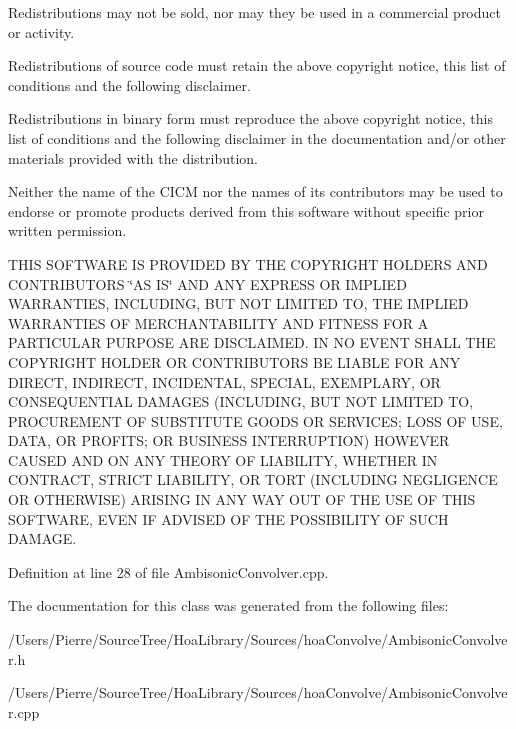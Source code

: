 \begin{DoxyItemize}
\item Redistributions may not be sold, nor may they be used in a commercial product or activity.
\item Redistributions of source code must retain the above copyright notice, this list of conditions and the following disclaimer.
\item Redistributions in binary form must reproduce the above copyright notice, this list of conditions and the following disclaimer in the documentation and/or other materials provided with the distribution.
\item Neither the name of the C\-I\-C\-M nor the names of its contributors may be used to endorse or promote products derived from this software without specific prior written permission.
\end{DoxyItemize}

T\-H\-I\-S S\-O\-F\-T\-W\-A\-R\-E I\-S P\-R\-O\-V\-I\-D\-E\-D B\-Y T\-H\-E C\-O\-P\-Y\-R\-I\-G\-H\-T H\-O\-L\-D\-E\-R\-S A\-N\-D C\-O\-N\-T\-R\-I\-B\-U\-T\-O\-R\-S \char`\"{}\-A\-S I\-S\char`\"{} A\-N\-D A\-N\-Y E\-X\-P\-R\-E\-S\-S O\-R I\-M\-P\-L\-I\-E\-D W\-A\-R\-R\-A\-N\-T\-I\-E\-S, I\-N\-C\-L\-U\-D\-I\-N\-G, B\-U\-T N\-O\-T L\-I\-M\-I\-T\-E\-D T\-O, T\-H\-E I\-M\-P\-L\-I\-E\-D W\-A\-R\-R\-A\-N\-T\-I\-E\-S O\-F M\-E\-R\-C\-H\-A\-N\-T\-A\-B\-I\-L\-I\-T\-Y A\-N\-D F\-I\-T\-N\-E\-S\-S F\-O\-R A P\-A\-R\-T\-I\-C\-U\-L\-A\-R P\-U\-R\-P\-O\-S\-E A\-R\-E D\-I\-S\-C\-L\-A\-I\-M\-E\-D. I\-N N\-O E\-V\-E\-N\-T S\-H\-A\-L\-L T\-H\-E C\-O\-P\-Y\-R\-I\-G\-H\-T H\-O\-L\-D\-E\-R O\-R C\-O\-N\-T\-R\-I\-B\-U\-T\-O\-R\-S B\-E L\-I\-A\-B\-L\-E F\-O\-R A\-N\-Y D\-I\-R\-E\-C\-T, I\-N\-D\-I\-R\-E\-C\-T, I\-N\-C\-I\-D\-E\-N\-T\-A\-L, S\-P\-E\-C\-I\-A\-L, E\-X\-E\-M\-P\-L\-A\-R\-Y, O\-R C\-O\-N\-S\-E\-Q\-U\-E\-N\-T\-I\-A\-L D\-A\-M\-A\-G\-E\-S (I\-N\-C\-L\-U\-D\-I\-N\-G, B\-U\-T N\-O\-T L\-I\-M\-I\-T\-E\-D T\-O, P\-R\-O\-C\-U\-R\-E\-M\-E\-N\-T O\-F S\-U\-B\-S\-T\-I\-T\-U\-T\-E G\-O\-O\-D\-S O\-R S\-E\-R\-V\-I\-C\-E\-S; L\-O\-S\-S O\-F U\-S\-E, D\-A\-T\-A, O\-R P\-R\-O\-F\-I\-T\-S; O\-R B\-U\-S\-I\-N\-E\-S\-S I\-N\-T\-E\-R\-R\-U\-P\-T\-I\-O\-N) H\-O\-W\-E\-V\-E\-R C\-A\-U\-S\-E\-D A\-N\-D O\-N A\-N\-Y T\-H\-E\-O\-R\-Y O\-F L\-I\-A\-B\-I\-L\-I\-T\-Y, W\-H\-E\-T\-H\-E\-R I\-N C\-O\-N\-T\-R\-A\-C\-T, S\-T\-R\-I\-C\-T L\-I\-A\-B\-I\-L\-I\-T\-Y, O\-R T\-O\-R\-T (I\-N\-C\-L\-U\-D\-I\-N\-G N\-E\-G\-L\-I\-G\-E\-N\-C\-E O\-R O\-T\-H\-E\-R\-W\-I\-S\-E) A\-R\-I\-S\-I\-N\-G I\-N A\-N\-Y W\-A\-Y O\-U\-T O\-F T\-H\-E U\-S\-E O\-F T\-H\-I\-S S\-O\-F\-T\-W\-A\-R\-E, E\-V\-E\-N I\-F A\-D\-V\-I\-S\-E\-D O\-F T\-H\-E P\-O\-S\-S\-I\-B\-I\-L\-I\-T\-Y O\-F S\-U\-C\-H D\-A\-M\-A\-G\-E. 

Definition at line 28 of file Ambisonic\-Convolver.\-cpp.



The documentation for this class was generated from the following files\-:\begin{DoxyCompactItemize}
\item 
/\-Users/\-Pierre/\-Source\-Tree/\-Hoa\-Library/\-Sources/hoa\-Convolve/Ambisonic\-Convolver.\-h\item 
/\-Users/\-Pierre/\-Source\-Tree/\-Hoa\-Library/\-Sources/hoa\-Convolve/Ambisonic\-Convolver.\-cpp\end{DoxyCompactItemize}
